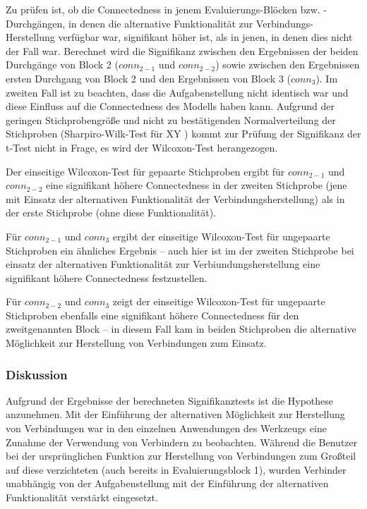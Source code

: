 Zu prüfen ist, ob die Connectedness in jenem Evaluierungs-Blöcken bzw. -Durchgängen, in denen die alternative Funktionalität zur Verbindungs-Herstellung verfügbar war, signifikant höher ist, als in jenen, in denen dies nicht der Fall war. Berechnet wird die Signifikanz zwischen den Ergebnissen der beiden Durchgänge von Block 2 ($conn_{2-1}$ und $conn_{2-2}$) sowie zwischen den Ergebnissen ersten Durchgang von Block 2 und den Ergebnissen von Block 3 ($conn_{3}$). Im zweiten Fall ist zu beachten, dass die Aufgabenstellung nicht identisch war und diese Einfluss auf die Connectedness des Modells haben kann. Aufgrund der geringen Stichprobengröße und nicht zu bestätigenden Normalverteilung der Stichproben \todo (Sharpiro-Wilk-Test für XY ) kommt zur Prüfung der Signifikanz der t-Test nicht in Frage, es wird der Wilcoxon-Test herangezogen.

Der einseitige Wilcoxon-Test für gepaarte Stichproben ergibt für $conn_{2-1}$ und $conn_{2-2}$ eine signifikant höhere Connectedness in der zweiten Stichprobe (jene mit Einsatz der alternativen Funktionalität der Verbindungsherstellung) als in der erste Stichprobe (ohne diese Funktionalität). 

Für $conn_{2-1}$ und $conn_{3}$ ergibt der einseitige Wilcoxon-Test für ungepaarte Stichproben ein ähnliches Ergebnis -- auch hier ist im der zweiten Stichprobe bei einsatz der alternativen Funktionalität zur Verbiundungsherstellung eine signifikant höhere Connectedness festzustellen.

Für $conn_{2-2}$ und $conn_{3}$ zeigt der einseitige Wilcoxon-Test für ungepaarte Stichproben ebenfalls eine signifikant höhere Connectedness für den zweitgenannten Block -- in diesem Fall kam in beiden Stichproben die alternative Möglichkeit zur Herstellung von Verbindungen zum Einsatz.

\subsubsection{Diskussion} %

Aufgrund der Ergebnisse der berechneten Signifikanztests ist die Hypothese anzunehmen. Mit der Einführung der alternativen Möglichkeit zur Herstellung von Verbindungen war in den einzelnen Anwendungen des Werkzeugs eine Zunahme der Verwendung von Verbindern zu beobachten. Während die Benutzer bei der ursprünglichen Funktion zur Herstellung von Verbindungen zum Großteil auf diese verzichteten (auch bereits in Evaluierungsblock 1), wurden Verbinder unabhängig von der Aufgabenstellung mit der Einführung der alternativen Funktionalität verstärkt eingesetzt.

